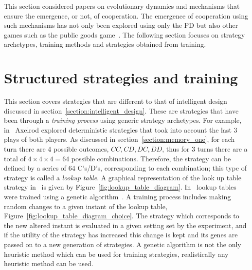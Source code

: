 This section considered papers on evolutionary dynamics and mechanisms that
ensure the emergence, or not, of cooperation. The emergence of cooperation using
such mechanisms has not only been explored using only the PD but also other games
such as the public goods game~\cite{Kaiping2016}. The following section focuses
on strategy archetypes, training methods and strategies obtained from training.

\section{Structured strategies and training}
\label{section:structured_strategies}

This section covers strategies that are different to that of intelligent design discussed
in section~\ref{section:intelligent_design}. These are strategies that have
been through a \textit{training process} using generic strategy archetypes. For example,
in~\cite{Axelrod1987} Axelrod explored deterministic strategies that
took into account the last 3 plays of both players. As discussed in
section~\ref{section:memory_one}, for each turn there are 4 possible outcomes,
\(CC, CD, DC, DD\), thus for 3 turns there are a total of
\(4\times4\times4=64\) possible combinations. Therefore, the strategy can be
defined by a series of 64 C's/D's, corresponding to each combination; this type
of strategy is called a \textit{lookup table}. A graphical representation of the
look up table strategy in~\cite{Axelrod1987} is given by Figure~\ref{fig:lookup_table_diagram}.
In~\cite{Axelrod1987} lookup tables were trained using a
genetic algorithm~\cite{Koza1997}. A training process includes making random changes to
a given instant of the lookup table, Figure~\ref{fig:lookup_table_diagram_choice}.
The strategy which corresponds to the new altered
instant is evaluated in a given setting set by the experiment, and if the
utility of the strategy has increased this change is kept and its genes are passed 
on to a new generation of strategies.
A genetic algorithm is not the only heuristic method which can be used for
training strategies, realistically any heuristic method can be used.


